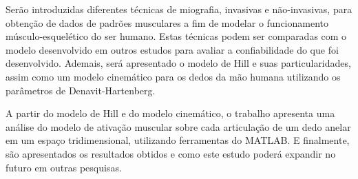 Serão introduzidas diferentes técnicas de miografia, invasivas e não-invasivas, para obtenção de dados de padrões musculares a fim de modelar o funcionamento músculo-esquelético do ser humano. Estas técnicas podem ser comparadas com o modelo desenvolvido em outros estudos para avaliar a confiabilidade do que foi desenvolvido. Ademais, será apresentado o modelo de Hill e suas particularidades, assim como um modelo cinemático para os dedos da mão humana utilizando os parâmetros de Denavit-Hartenberg.

A partir do modelo de Hill e do modelo cinemático, o trabalho apresenta uma análise do modelo de ativação muscular sobre cada articulação de um dedo anelar em um espaço tridimensional, utilizando ferramentas do MATLAB. E finalmente, são apresentados os resultados obtidos e como este estudo poderá expandir no futuro em outras pesquisas.